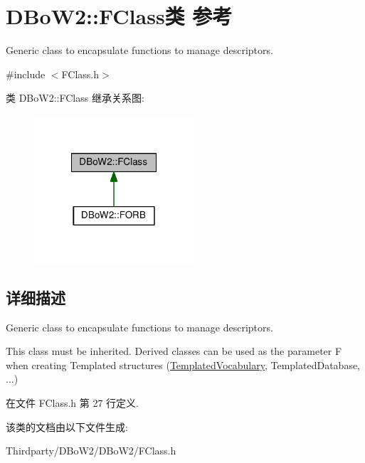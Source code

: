 \hypertarget{classDBoW2_1_1FClass}{\section{D\-Bo\-W2\-:\-:F\-Class类 参考}
\label{classDBoW2_1_1FClass}
}


Generic class to encapsulate functions to manage descriptors.  




{\ttfamily \#include $<$F\-Class.\-h$>$}



类 D\-Bo\-W2\-:\-:F\-Class 继承关系图\-:
\nopagebreak
\begin{figure}[H]
\begin{center}
\leavevmode
\includegraphics[width=168pt]{classDBoW2_1_1FClass__inherit__graph}
\end{center}
\end{figure}


\subsection{详细描述}
Generic class to encapsulate functions to manage descriptors. 

This class must be inherited. Derived classes can be used as the parameter F when creating Templated structures (\hyperlink{classDBoW2_1_1TemplatedVocabulary}{Templated\-Vocabulary}, Templated\-Database, ...) 

在文件 F\-Class.\-h 第 27 行定义.



该类的文档由以下文件生成\-:\begin{DoxyCompactItemize}
\item 
Thirdparty/\-D\-Bo\-W2/\-D\-Bo\-W2/F\-Class.\-h\end{DoxyCompactItemize}
